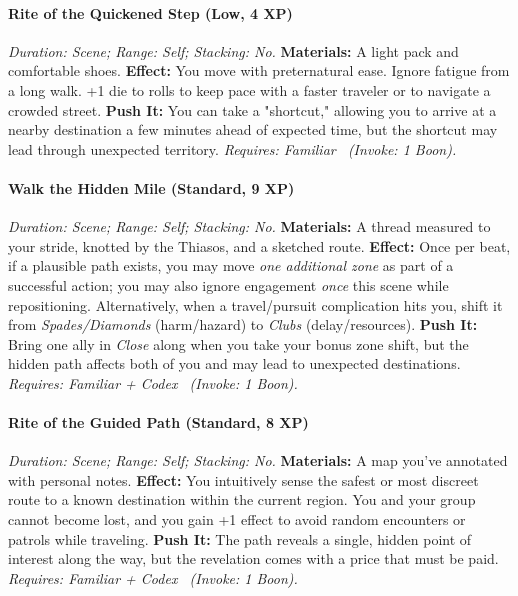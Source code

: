 \documentclass[12pt,twoside]{book}
\begin{document}
\paragraph{Rite of the Quickened Step (Low, 4 XP)} \emph{Duration: Scene; Range: Self; Stacking: No.}
\textbf{Materials:} A light pack and comfortable shoes.
\textbf{Effect:} You move with preternatural ease. Ignore fatigue from a long walk. +1 die to rolls to keep pace with a faster traveler or to navigate a crowded street.
\textbf{Push It:} You can take a "shortcut," allowing you to arrive at a nearby destination a few minutes ahead of expected time, but the shortcut may lead through unexpected territory.
\emph{Requires: Familiar \ (\textit{Invoke:} 1 Boon).}
\paragraph{Walk the Hidden Mile (Standard, 9 XP)} \emph{Duration: Scene; Range: Self; Stacking: No.}
\textbf{Materials:} A thread measured to your stride, knotted by the Thiasos, and a sketched route.
\textbf{Effect:} Once per beat, if a plausible path exists, you may move \emph{one additional zone} as part of a successful action; you may also ignore engagement \emph{once} this scene while repositioning. Alternatively, when a travel/pursuit complication hits you, shift it from \emph{Spades/Diamonds} (harm/hazard) to \emph{Clubs} (delay/resources).
\textbf{Push It:} Bring one ally in \emph{Close} along when you take your bonus zone shift, but the hidden path affects both of you and may lead to unexpected destinations.
\emph{Requires: Familiar + Codex \ (\textit{Invoke:} 1 Boon).}
\paragraph{Rite of the Guided Path (Standard, 8 XP)} \emph{Duration: Scene; Range: Self; Stacking: No.}
\textbf{Materials:} A map you've annotated with personal notes.
\textbf{Effect:} You intuitively sense the safest or most discreet route to a known destination within the current region. You and your group cannot become lost, and you gain +1 effect to avoid random encounters or patrols while traveling.
\textbf{Push It:} The path reveals a single, hidden point of interest along the way, but the revelation comes with a price that must be paid.
\emph{Requires: Familiar + Codex \ (\textit{Invoke:} 1 Boon).}
\end{document}

